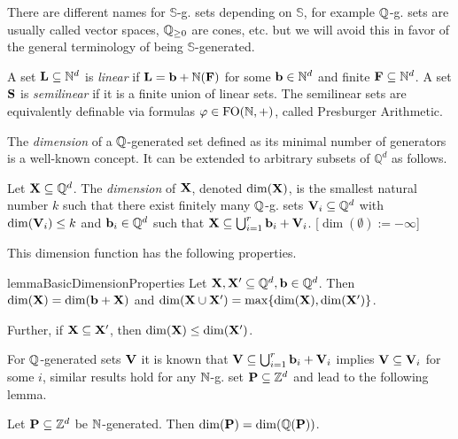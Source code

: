There are different names for \(\mathbb{S}\)-g. sets depending on \(\mathbb{S}\), for example \(\mathbb{Q}\)-g. sets are usually called vector spaces, \(\mathbb{Q}_{\geq 0}\) are cones, etc. but we will avoid this in favor of the general terminology of being \(\mathbb{S}\)-generated.

A set \(\mathbf{L} \subseteq \mathbb{N}^d\) is \emph{linear} if \(\mathbf{L}=\mathbf{b}+\mathbb{N}(\mathbf{F})\) for some \(\mathbf{b} \in \mathbb{N}^d\) and finite \(\mathbf{F} \subseteq \mathbb{N}^d\). A set \(\mathbf{S}\) is \emph{semilinear} if it is a finite union of linear sets. The semilinear sets are equivalently definable via formulas \(\varphi \in \operatorname{FO}(\mathbb{N}, +)\), called Presburger Arithmetic.

The \emph{dimension} of a \(\mathbb{Q}\)-generated set defined as its minimal number of generators is a well-known concept. It can be extended to arbitrary subsets of \(\mathbb{Q}^d\) as follows.

\begin{definition}{\cite{Leroux11}}
Let \(\mathbf{X} \subseteq \mathbb{Q}^d\). The \emph{dimension} of \(\mathbf{X}\), denoted \(\dim(\mathbf{X})\), is the smallest natural number \(k\) such that there exist finitely many \(\mathbb{Q}\)-g. sets \(\mathbf{V}_i \subseteq \mathbb{Q}^d\) with \(\dim(\mathbf{V}_i)\leq k\) and \(\mathbf{b}_i \in \mathbb{Q}^d\) such that \(\mathbf{X} \subseteq \bigcup_{i=1}^r \mathbf{b}_i + \mathbf{V}_i\). [\(\dim(\emptyset):=-\infty\)]
\end{definition}

This dimension function has the following properties.

\begin{restatable}{lemma}{BasicDimensionProperties}
Let \(\mathbf{X}, \mathbf{X}' \subseteq \mathbb{Q}^d, \mathbf{b}\in \mathbb{Q}^d\). Then \(\dim(\mathbf{X})=\dim(\mathbf{b}+\mathbf{X})\) and 
\(\dim(\mathbf{X} \cup \mathbf{X}')=\max \{\dim(\mathbf{X}), \dim(\mathbf{X}')\}\). 

Further, if \(\mathbf{X} \subseteq \mathbf{X}'\), then \(\dim(\mathbf{X}) \leq \dim(\mathbf{X}')\). \label{BasicDimensionProperties}
\end{restatable}

For \(\mathbb{Q}\)-generated sets \(\mathbf{V}\) it is known that \(\mathbf{V} \subseteq \bigcup_{i=1}^r \mathbf{b}_i+\mathbf{V}_i\) implies \(\mathbf{V} \subseteq \mathbf{V}_i\) for some \(i\), similar results hold for any \(\mathbb{N}\)-g. set \(\mathbf{P}\subseteq \mathbb{Z}^d\) and lead to the following lemma.

\begin{lemma}{\cite[Lemma 5.3]{Leroux11}} \label{LemmaFromJerome}
Let \(\mathbf{P} \subseteq \mathbb{Z}^d\) be \(\mathbb{N}\)-generated. Then \(\dim(\mathbf{P})=\dim(\mathbb{Q}(\mathbf{P}))\).
\end{lemma}

